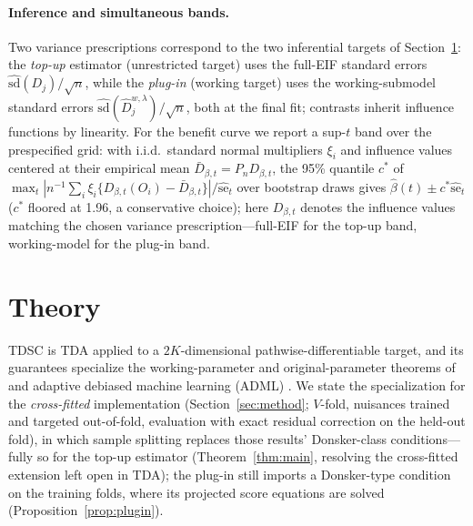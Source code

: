 \documentclass[11pt]{article}
\theoremstyle{remark}
\newcommand{\Pn}{P_n}
\begin{document}
\paragraph{Inference and simultaneous bands.} Two variance prescriptions correspond to the two inferential targets of Section~\ref{sec:theory}: the \emph{top-up} estimator (unrestricted target) uses the full-EIF standard errors $\widehat{\mathrm{sd}}(D_j)/\sqrt n$, while the \emph{plug-in} (working target) uses the working-submodel standard errors $\widehat{\mathrm{sd}}(\widehat D^{w,\lambda}_j)/\sqrt n$, both at the final fit; contrasts inherit influence functions by linearity. For the benefit curve we report a sup-$t$ band over the prespecified grid: with i.i.d.\ standard normal multipliers $\xi_i$ and influence values centered at their empirical mean $\bar D_{\beta,t} = \Pn D_{\beta,t}$, the 95\% quantile $c^*$ of $\max_t |n^{-1}\sum_i \xi_i \{D_{\beta,t}(O_i) - \bar D_{\beta,t}\}|/\widehat{\mathrm{se}}_t$ over bootstrap draws gives $\hat\beta(t) \pm c^*\widehat{\mathrm{se}}_t$ ($c^*$ floored at 1.96, a conservative choice); here $D_{\beta,t}$ denotes the influence values matching the chosen variance prescription---full-EIF for the top-up band, working-model for the plug-in band.

\section{Theory}\label{sec:theory}

TDSC is TDA applied to a $2K$-dimensional pathwise-differentiable target, and its guarantees specialize the working-parameter and original-parameter theorems of \citet{li2025tda} and adaptive debiased machine learning (ADML) \citep{vdl2023adml}. We state the specialization for the \emph{cross-fitted} implementation (Section~\ref{sec:method}; $V$-fold, nuisances trained and targeted out-of-fold, evaluation with exact residual correction on the held-out fold), in which sample splitting replaces those results' Donsker-class conditions---fully so for the top-up estimator (Theorem~\ref{thm:main}, resolving the cross-fitted extension left open in TDA); the plug-in still imports a Donsker-type condition on the training folds, where its projected score equations are solved (Proposition~\ref{prop:plugin}).
\end{document}
